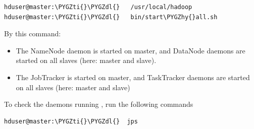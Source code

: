 \documentclass[a4paper,12pt,oneside]{sphinxmanual}
\def\PYGZdl{\char`\$}
\def\PYGZhy{\char`\-}
\def\PYGZti{\char`\~}
\begin{document}
\begin{Verbatim}[commandchars=\\\{\}]
hduser@master:\PYGZti{}\PYGZdl{}   /usr/local/hadoop
hduser@master:\PYGZti{}\PYGZdl{}   bin/start\PYGZhy{}all.sh
\end{Verbatim}
\begin{figure}[htbp]
\centering

\end{figure}

By this command:
\begin{itemize}
\item {} 
The NameNode daemon is started on master, and DataNode daemons are started on all slaves (here: master and slave).

\item {} 
The JobTracker is started on master, and TaskTracker daemons are started on all slaves (here: master and slave)

\end{itemize}

To check the daemons running , run the following commands

\begin{Verbatim}[commandchars=\\\{\}]
hduser@master:\PYGZti{}\PYGZdl{}  jps
\end{Verbatim}
\begin{figure}[htbp]
\centering

\end{figure}
\end{document}

